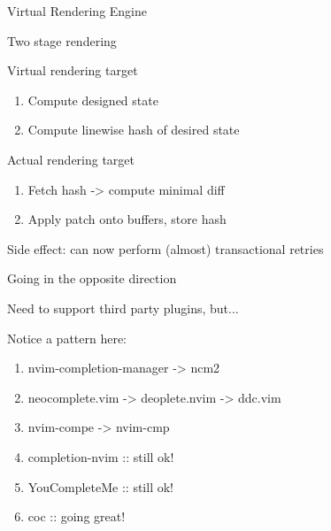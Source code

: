 \documentclass{beamer}
\begin{document}
\begin{frame}{Virtual Rendering Engine}


	Two stage rendering

	Virtual rendering target

	\begin{enumerate}

		\item Compute designed state


		\item Compute linewise hash of desired state

	\end{enumerate}


	Actual rendering target

	\begin{enumerate}

		\item Fetch hash -> compute minimal diff


		\item Apply patch onto buffers, store hash


	\end{enumerate}


	Side effect: can now perform (almost) transactional retries



\end{frame}



\begin{frame}{Going in the opposite direction}

	Need to support third party plugins, but...

	Notice a pattern here:

	\begin{enumerate}

		\item nvim-completion-manager -> ncm2

		\item neocomplete.vim -> deoplete.nvim -> ddc.vim

		\item nvim-compe -> nvim-cmp

		\item completion-nvim :: still ok!

		\item YouCompleteMe :: still ok!

		\item coc :: going great!

	\end{enumerate}


\end{frame}
\end{document}
